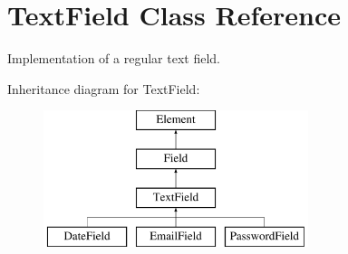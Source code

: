 \hypertarget{class_text_field}{
\section{TextField Class Reference}
\label{class_text_field}
}


Implementation of a regular text field.  


Inheritance diagram for TextField:\begin{figure}[H]
\begin{center}
\leavevmode
\includegraphics[height=4.000000cm]{class_text_field}
\end{center}
\end{figure}
